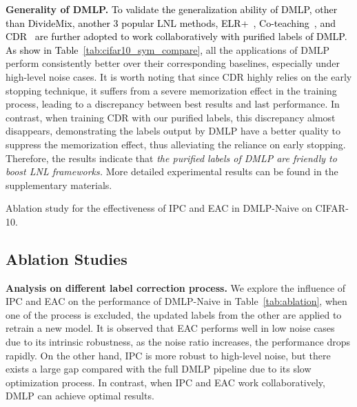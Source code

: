 \documentclass[10pt,twocolumn,letterpaper]{article}
\newcommand{\zbsN}[1]{\textcolor{black}{#1}}
\begin{document}
 \textbf{Generality of DMLP.} 
\zbsN{ To validate the generalization ability of DMLP, other than DivideMix, another 3 popular LNL methods, ELR+~\cite{2020ELR}, Co-teaching~\cite{Co-han2018co}, and CDR~\cite{2021CDR} are further adopted to work collaboratively with purified labels of DMLP. As show in  Table~\ref{tab:cifar10_sym_compare},}
all the applications of DMLP perform consistently better over their corresponding baselines, especially under high-level noise cases. 
It is worth noting that since CDR highly relies on the early stopping technique, it suffers from a severe memorization effect in the training process, leading to a discrepancy between best results and last performance. In contrast, when training CDR with our purified labels, this discrepancy almost disappears, demonstrating the labels output by DMLP have a better quality to suppress the memorization effect, thus alleviating the reliance on early stopping. Therefore, the results indicate that \emph{the purified labels of DMLP are friendly to boost LNL frameworks.} {More detailed experimental results can be found in the supplementary materials.}

 \begin{table}[!t]
\footnotesize
    \caption{
        Ablation study for the effectiveness of IPC and EAC in DMLP-Naive on CIFAR-10. } 
    \vspace{-1em}
    \centering 
    \resizebox{0.49\textwidth}{!}{\xmark\xmark}
    \vspace{-3mm}
    \label{tab:ablation} 
\end{table} 
 
\subsection{Ablation Studies}
 \textbf{Analysis on different label correction process.} We explore the influence of
IPC and EAC on the performance of DMLP-Naive in Table~\ref{tab:ablation}, {when one of the process is excluded, the updated labels from the other are applied to retrain a new model}. {It is observed} that EAC performs well in low noise cases due to its intrinsic robustness, as the noise ratio increases, the performance drops rapidly. On the other hand, IPC is more robust to {high-level noise}, but there exists a large gap {compared with the full DMLP pipeline due} to its slow optimization process. In contrast, {when IPC and EAC work collaboratively, DMLP can achieve optimal results}. 
\end{document}
